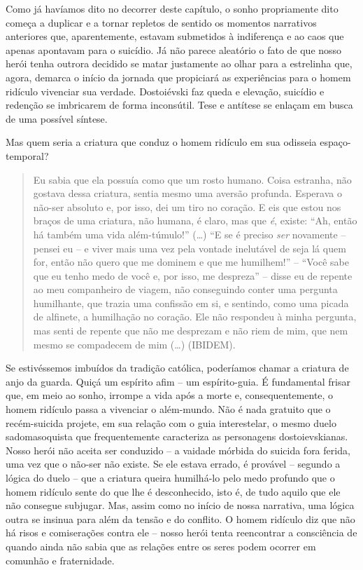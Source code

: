 Como já havíamos dito no decorrer deste capítulo, o sonho propriamente
dito começa a duplicar e a tornar repletos de sentido os momentos
narrativos anteriores que, aparentemente, estavam submetidos à
indiferença e ao caos que apenas apontavam para o suicídio. Já não
parece aleatório o fato de que nosso herói tenha outrora decidido se
matar justamente ao olhar para a estrelinha que, agora, demarca o início
da jornada que propiciará as experiências para o homem ridículo
vivenciar sua verdade. Dostoiévski faz queda e elevação, suicídio e
redenção se imbricarem de forma inconsútil. Tese e antítese se enlaçam
em busca de uma possível síntese.

Mas quem seria a criatura que conduz o homem ridículo em sua odisseia
espaço-temporal?

\begin{quote}
Eu sabia que ela possuía como que um rosto humano. Coisa estranha, não
gostava dessa criatura, sentia mesmo uma aversão profunda. Esperava o
não-ser absoluto e, por isso, dei um tiro no coração. E eis que estou
nos braços de uma criatura, não humana, é claro, mas que \emph{é},
existe: ``Ah, então há também uma vida além-túmulo!'' (\ldots{}) ``E se
é preciso \emph{ser} novamente -- pensei eu -- e viver mais uma vez pela
vontade inelutável de seja lá quem for, então não quero que me dominem e
que me humilhem!'' -- ``Você sabe que eu tenho medo de você e, por isso,
me despreza'' -- disse eu de repente ao meu companheiro de viagem, não
conseguindo conter uma pergunta humilhante, que trazia uma confissão em
si, e sentindo, como uma picada de alfinete, a humilhação no coração.
Ele não respondeu à minha pergunta, mas senti de repente que não me
desprezam e não riem de mim, que nem mesmo se compadecem de mim
(\ldots{}) (IBIDEM).
\end{quote}

Se estivéssemos imbuídos da tradição católica, poderíamos chamar a
criatura de anjo da guarda. Quiçá um espírito afim -- um espírito-guia.
É fundamental frisar que, em meio ao sonho, irrompe a vida após a morte
e, consequentemente, o homem ridículo passa a vivenciar o além-mundo.
Não é nada gratuito que o recém-suicida projete, em sua relação com o
guia interestelar, o mesmo duelo sadomasoquista que frequentemente
caracteriza as personagens dostoievskianas. Nosso herói não aceita ser
conduzido -- a vaidade mórbida do suicida fora ferida, uma vez que o
não-ser não existe. Se ele estava errado, é provável -- segundo a lógica
do duelo -- que a criatura queira humilhá-lo pelo medo profundo que o
homem ridículo sente do que lhe é desconhecido, isto é, de tudo aquilo
que ele não consegue subjugar. Mas, assim como no início de nossa
narrativa, uma lógica outra se insinua para além da tensão e do
conflito. O homem ridículo diz que não há risos e comiserações contra
ele -- nosso herói tenta reencontrar a consciência de quando ainda não
sabia que as relações entre os seres podem ocorrer em comunhão e
fraternidade.

